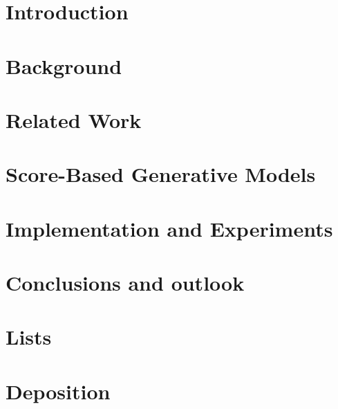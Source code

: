 \documentclass[a4paper, 12pt, oneside, BCOR=0cm]{scrbook}
\begin{document}
\mainmatter
\chapter{Introduction}


\chapter{Background}





\chapter{Related Work}



\chapter{Score-Based Generative Models} %





\chapter{Implementation and Experiments} \label{chap:5}



\chapter{Conclusions and outlook} %
\appendix 
\chapter{Lists}
\listoffigures
\listoftables

\listofalgorithms



\chapter{Deposition}

\end{document}
